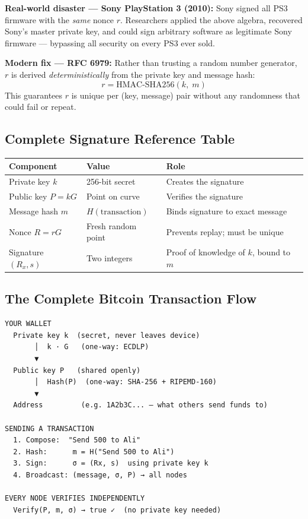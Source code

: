 \documentclass[12pt, a4paper]{article}
\begin{document}
\textbf{Real-world disaster --- Sony PlayStation 3 (2010):} Sony signed all
PS3 firmware with the \emph{same} nonce $r$. Researchers applied the above
algebra, recovered Sony's master private key, and could sign arbitrary software
as legitimate Sony firmware --- bypassing all security on every PS3 ever sold.

\textbf{Modern fix --- RFC 6979:} Rather than trusting a random number
generator, $r$ is derived \emph{deterministically} from the private key and
message hash:
\[
    r = \text{HMAC-SHA256}(k,\; m)
\]
This guarantees $r$ is unique per (key, message) pair without any randomness
that could fail or repeat.

\subsection{Complete Signature Reference Table}

\begin{center}
\begin{tabular}{l l l}
\toprule
\textbf{Component} & \textbf{Value} & \textbf{Role} \\
\midrule
Private key $k$      & 256-bit secret          & Creates the signature \\
Public key $P = kG$  & Point on curve          & Verifies the signature \\
Message hash $m$     & $H(\text{transaction})$ & Binds signature to exact message \\
Nonce $R = rG$       & Fresh random point      & Prevents replay; must be unique \\
Signature $(R_x, s)$ & Two integers            & Proof of knowledge of $k$, bound to $m$ \\
\bottomrule
\end{tabular}
\end{center}

\subsection{The Complete Bitcoin Transaction Flow}

\begin{verbatim}
YOUR WALLET
  Private key k  (secret, never leaves device)
       │  k · G   (one-way: ECDLP)
       ▼
  Public key P   (shared openly)
       │  Hash(P)  (one-way: SHA-256 + RIPEMD-160)
       ▼
  Address         (e.g. 1A2b3C... — what others send funds to)

SENDING A TRANSACTION
  1. Compose:  "Send 500 to Ali"
  2. Hash:      m = H("Send 500 to Ali")
  3. Sign:      σ = (Rx, s)  using private key k
  4. Broadcast: (message, σ, P) → all nodes

EVERY NODE VERIFIES INDEPENDENTLY
  Verify(P, m, σ) → true ✓  (no private key needed)
\end{verbatim}
\end{document}
